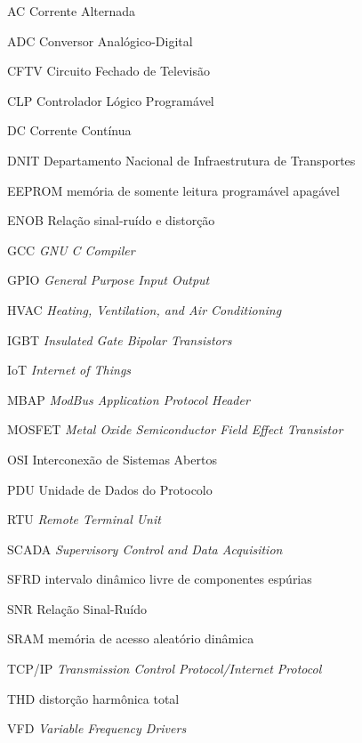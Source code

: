 \begin{siglas}
  \item[AC] Corrente Alternada
  \item[ADC] Conversor Analógico-Digital
  \item[CFTV] Circuito Fechado de Televisão
  \item[CLP] Controlador Lógico Programável
  \item[DC] Corrente Contínua
  \item[DNIT] Departamento Nacional de Infraestrutura de Transportes
  \item[EEPROM] memória de somente leitura programável apagável
  \item[ENOB] Relação sinal-ruído e distorção
  \item[GCC] \textit{GNU C Compiler}
  \item[GPIO] \textit{General Purpose Input Output}
  \item[HVAC] \textit{Heating, Ventilation, and Air Conditioning}
  \item[IGBT] \textit{Insulated Gate Bipolar Transistors}
  \item[IoT] \textit{Internet of Things}
  \item[MBAP] \textit{ModBus Application Protocol Header}
  \item[MOSFET] \textit{Metal Oxide Semiconductor Field Effect Transistor}
  \item[OSI] Interconexão de Sistemas Abertos
  \item[PDU] Unidade de Dados do Protocolo
  \item[RTU] \textit{Remote Terminal Unit}
  \item[SCADA] \textit{Supervisory Control and Data Acquisition}
  \item[SFRD] intervalo dinâmico livre de componentes espúrias
  \item[SNR] Relação Sinal-Ruído
  \item[SRAM] memória de acesso aleatório dinâmica
  \item[TCP/IP] \textit{Transmission Control Protocol/Internet Protocol}
  \item[THD] distorção harmônica total
  \item[VFD] \textit{Variable Frequency Drivers}
\end{siglas}
